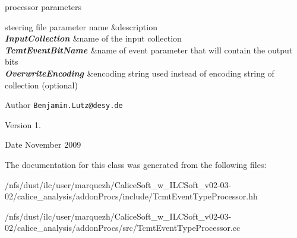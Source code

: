 \begin{DoxyParagraph}{processor parameters}
\begin{TabularC}{2}
\hline
steering file parameter name &description  \\
{\bfseries {\itshape  Input\-Collection }}&name of the input collection  \\
{\bfseries {\itshape  Tcmt\-Event\-Bit\-Name }}&name of event parameter that will contain the output bits \\
{\bfseries {\itshape  Overwrite\-Encoding }}&encoding string used instead of encoding string of collection (optional)  \\
\end{TabularC}

\end{DoxyParagraph}
\begin{DoxyAuthor}{Author}
{\tt Benjamin.\-Lutz@desy.\-de} 
\end{DoxyAuthor}
\begin{DoxyVersion}{Version}
1. 
\end{DoxyVersion}
\begin{DoxyDate}{Date}
November 2009 
\end{DoxyDate}


The documentation for this class was generated from the following files\-:\begin{DoxyCompactItemize}
\item 
/nfs/dust/ilc/user/marquezh/\-Calice\-Soft\-\_\-w\-\_\-\-I\-L\-C\-Soft\-\_\-v02-\/03-\/02/calice\-\_\-analysis/addon\-Procs/include/Tcmt\-Event\-Type\-Processor.\-hh\item 
/nfs/dust/ilc/user/marquezh/\-Calice\-Soft\-\_\-w\-\_\-\-I\-L\-C\-Soft\-\_\-v02-\/03-\/02/calice\-\_\-analysis/addon\-Procs/src/Tcmt\-Event\-Type\-Processor.\-cc\end{DoxyCompactItemize}
